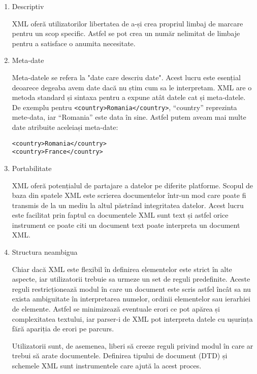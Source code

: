 \begin{enumerate}[wide=0pt, listparindent=1.25em, parsep=1pt]
\item Descriptiv

XML oferă utilizatorilor libertatea de a-și crea propriul limbaj de marcare pentru un scop specific.
Astfel se pot crea un număr nelimitat de limbaje pentru a satisface o anumita necesitate.

\item Meta-date

Meta-datele se refera la "date care descriu date". 
Acest lucru este esențial deoarece degeaba avem date dacă nu știm cum sa le interpretam. 
XML are o metoda standard și sintaxa pentru a expune atât datele cat și meta-datele. 
De exemplu pentru \verb|<country>Romania</country>|, “country” reprezinta mete-data, iar “Romania” este data în sine. 
Astfel putem aveam mai multe date atribuite aceleiași meta-date:

\lstset{language=XML}
\begin{lstlisting} 
<country>Romania</country>
<country>France</country>
\end{lstlisting}

\item Portabilitate

XML oferă potențialul de partajare a datelor pe diferite platforme. 
Scopul de baza din spatele XML este scrierea documentelor într-un mod care poate fi transmis de la un mediu la altul păstrând 
integritatea datelor. Acest lucru este facilitat prin faptul ca documentele XML sunt text și astfel orice instrument ce poate 
citi un document text poate interpreta un document XML. 

\item Structura neambigua

Chiar dacă XML este flexibil în definirea elementelor este strict în alte aspecte, 
iar utilizatorii trebuie sa urmeze un set de reguli predefinite. 
Aceste reguli restricționează modul în care un document este scris astfel încât sa nu exista ambiguitate în interpretarea numelor, 
ordinii elementelor sau ierarhiei de elemente. Astfel se minimizează eventuale erori ce pot apărea și complexitatea textului, 
iar parser-i de XML pot interpreta datele cu ușurința fără apariția de erori pe parcurs.\newline 

Utilizatorii sunt, de asemenea, liberi să creeze reguli privind modul în care ar trebui să arate documentele.
Definirea tipului de document (DTD) și schemele XML sunt instrumentele care ajută la acest
proces.
\end{enumerate}

